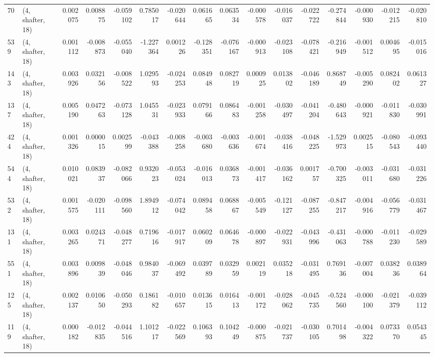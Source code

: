 \begin{tabular}{llrrrrrrrrrrrrrr}
70  &  (4, shafter, 18) &   0.002075 &  0.008875 & -0.059102 &    0.785017 & -0.020644 &   0.061665 &   0.063534 & -0.000578 & -0.016037 & -0.022722 &   -0.274844 & -0.000930 &  -0.012215 &  -0.020810 \\
539 &  (4, shafter, 18) &   0.001112 & -0.008873 & -0.055040 &   -1.227364 &  0.001226 &  -0.128351 &  -0.076167 & -0.000913 & -0.023108 & -0.078421 &   -0.216949 & -0.001512 &   0.004695 &  -0.015016 \\
143 &  (4, shafter, 18) &   0.003926 &  0.032156 & -0.008522 &    1.029593 & -0.024253 &   0.084948 &   0.082719 &  0.000925 &  0.013802 & -0.046189 &    0.868749 & -0.005290 &   0.082402 &   0.061327 \\
137 &  (4, shafter, 18) &   0.005190 &  0.047263 & -0.073128 &    1.045531 & -0.023933 &   0.079166 &   0.086483 & -0.001258 & -0.030497 & -0.041204 &   -0.480643 & -0.000921 &  -0.011830 &  -0.030991 \\
424 &  (4, shafter, 18) &   0.001326 &  0.000015 &  0.002599 &   -0.043388 & -0.008258 &  -0.003680 &  -0.003636 & -0.001674 & -0.038416 & -0.048225 &   -1.529973 &  0.002515 &  -0.080543 &  -0.093440 \\
544 &  (4, shafter, 18) &   0.010021 &  0.083937 & -0.082066 &    0.932023 & -0.053024 &  -0.016013 &   0.036873 & -0.001417 & -0.036162 &  0.001757 &   -0.700325 & -0.003011 &  -0.031680 &  -0.031226 \\
532 &  (4, shafter, 18) &   0.001575 & -0.020111 & -0.098560 &    1.894912 & -0.074042 &   0.089458 &   0.068867 & -0.005549 & -0.121127 & -0.087255 &   -0.847217 & -0.004916 &  -0.056779 &  -0.031467 \\
131 &  (4, shafter, 18) &   0.003265 &  0.024371 & -0.048277 &    0.719616 & -0.017917 &   0.060209 &   0.064678 & -0.000897 & -0.022931 & -0.043996 &   -0.431063 & -0.000788 &  -0.011230 &  -0.029589 \\
551 &  (4, shafter, 18) &   0.003896 &  0.009839 & -0.048046 &    0.984037 & -0.069492 &   0.039789 &   0.032959 &  0.002119 &  0.035218 & -0.031495 &    0.769136 & -0.007004 &   0.038236 &   0.038964 \\
125 &  (4, shafter, 18) &   0.002137 &  0.010650 & -0.050293 &    0.186182 & -0.010657 &   0.013615 &   0.016413 & -0.001172 & -0.028062 & -0.045735 &   -0.524560 & -0.000100 &  -0.021379 &  -0.039112 \\
119 &  (4, shafter, 18) &   0.000182 & -0.012835 & -0.044516 &    1.101217 & -0.022569 &   0.106393 &   0.104249 & -0.000875 & -0.021737 & -0.030105 &    0.701498 & -0.004322 &   0.073370 &   0.054345 \\

\end{tabular}
